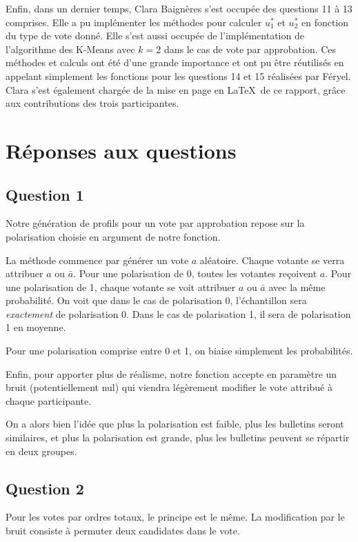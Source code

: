 \documentclass[11pt]{article}
\begin{document}
Enfin, dans un dernier temps, Clara Baignères s’est occupée des questions 11 à 13 comprises. Elle a pu implémenter les méthodes pour calculer $u_1^*$ et $u_2^*$ en fonction du type de vote donné. Elle s’est aussi occupée de l’implémentation de l’algorithme des K-Means avec $k=2$ dans le cas de vote par approbation. Ces méthodes et calculs ont été d’une grande importance et ont pu être réutilisés en appelant simplement les fonctions pour les questions 14 et 15 réalisées par Féryel. Clara s'est également chargée de la mise en page en \LaTeX~de ce rapport, grâce aux contributions des trois participantes.

\section{Réponses aux questions}

\subsection{Question 1}

Notre génération de profils pour un vote par approbation repose sur la polarisation choisie en argument de notre fonction. 

La méthode commence par générer un vote $a$ aléatoire. Chaque votante se verra attribuer $a$ ou $\bar{a}$. Pour une polarisation de 0, toutes les votantes reçoivent $a$. Pour une polarisation de 1, chaque votante se voit attribuer $a$ ou $\bar{a}$ avec la même probabilité. On voit que dans le cas de polarisation 0, l'échantillon sera \emph{exactement} de polarisation 0. Dans le cas de polarisation 1, il sera de polarisation 1 en moyenne.

Pour une polarisation comprise entre 0 et 1, on biaise simplement les probabilités.
	
Enfin, pour apporter plus de réalisme, notre fonction accepte en paramètre un bruit (potentiellement nul) qui viendra légèrement modifier le vote attribué à chaque participante.

On a alors bien l'idée que plus la polarisation est faible, plus les bulletins seront similaires, et plus la polarisation est grande, plus les bulletins peuvent se répartir en deux groupes. 

\subsection{Question 2}

Pour les votes par ordres totaux, le principe est le même. La modification par le bruit consiste à permuter deux candidates dans le vote. 
 
\end{document}
